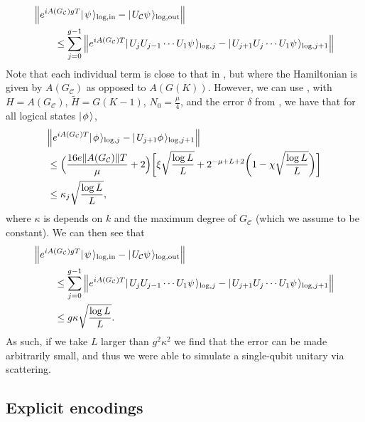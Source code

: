 \documentclass[../thesis-main/thesis-main]{subfiles}
\begin{document}
\begin{align}
  &\Big \Vert e^{ i A(G_{\mathcal{C}} )g T} |\mspace{2mu} \psi \mspace{2mu} \rangle_{\text{log},\text{in}} - |\mspace{2mu} U_{\mathcal{C}} \psi \mspace{2mu} \rangle_{\text{log},\text{out}}\Big \Vert\nonumber\\
  & \qquad \leq \sum_{j = 0}^{g-1} \Big \Vert e^{ i A(G_{\mathcal{C}})T} |\mspace{2mu} U_{j} U_{j-1}\cdots U_1 \psi \mspace{2mu} \rangle_{\text{log},j} - |\mspace{2mu} U_{j+1}U_{j} \cdots U_1 \psi \mspace{2mu} \rangle_{\text{log},j+1}\Big \Vert
\end{align}
Note that each individual term is close to that in , but where the Hamiltonian is given by $A(G_{\mathcal{C}})$ as opposed to $A(G(K))$.  However, we can use , with $H = A(G_{\mathcal{C}})$, $\tilde{H} = G(K-1)$,  $N_0 = \frac{\mu}{4}$, and the error $\delta$ from , we have that for all logical states $|\mspace{2mu} \phi \mspace{2mu} \rangle$,
\begin{align}
   &\Big \Vert e^{ i A(G_{\mathcal{C}})T} |\mspace{2mu} \phi \mspace{2mu} \rangle_{\text{log},j} - |\mspace{2mu} U_{j+1}\phi \mspace{2mu} \rangle_{\text{log},j+1}\Big \Vert\nonumber\\
   &\leq \Big(\frac{ 16 e \|{A(G_{\mathcal{C}})}\| T}{\mu} + 2\Big)\bigg[ \xi \sqrt{\frac{\log L}{L}} + 2^{- \mu + L +2} \bigg(1 -   \chi \sqrt{\frac{\log L}{L}} \bigg)\bigg]\\
   & \leq \kappa_j \sqrt{\frac{\log L}{L}},
\end{align}
where $\kappa$ is depends on $k$ and the maximum degree of $G_{\mathcal{C}}$ (which we assume to be constant).  We can then see that
\begin{align}
  &\Big \Vert e^{ i A(G_{\mathcal{C}} )g T} |\mspace{2mu} \psi \mspace{2mu} \rangle_{\text{log},\text{in}} - |\mspace{2mu} U_{\mathcal{C}} \psi \mspace{2mu} \rangle_{\text{log},\text{out}}\Big \Vert\nonumber\\
  & \qquad \leq \sum_{j = 0}^{g-1} \Big \Vert e^{ i A(G_{\mathcal{C}})T} |\mspace{2mu} U_{j} U_{j-1}\cdots U_1 \psi \mspace{2mu} \rangle_{\text{log},j} - |\mspace{2mu} U_{j+1}U_{j} \cdots U_1 \psi \mspace{2mu} \rangle_{\text{log},j+1}\Big \Vert\\
  &\qquad \leq g\kappa \sqrt{\frac{\log L}{L}}.
\end{align}
As such, if we take $L$ larger than $g^2\kappa^2$ we find that the error can be made arbitrarily small, and thus we were able to simulate a single-qubit unitary via scattering.


\subsection{Explicit encodings}\label{sec:explicit_encodings}
\end{document}

